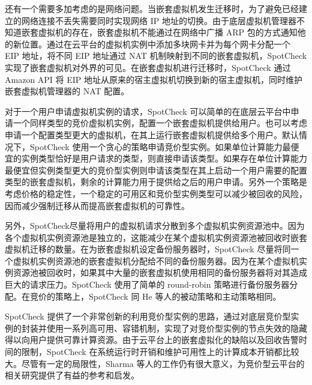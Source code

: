 还有一个需要多加考虑的是网络问题。当嵌套虚拟机发生迁移时，为了避免已经建立的网络连接不丢失需要同时实现网络 IP 地址的切换。由于底层虚拟机管理器不知道嵌套虚拟机的存在，嵌套虚拟机不能通过在网络中广播 ARP 包的方式通知他的新位置。通过在云平台的虚拟机实例中添加多块网卡并为每个网卡分配一个 EIP 地址，将不同 EIP 地址通过 NAT 机制映射到不同的嵌套虚拟机，SpotCheck 实现了嵌套虚拟机对外界的可见。在嵌套虚拟机进行迁移时，SpotCheck 通过 Amazon API 将 EIP 地址从原来的宿主虚拟机切换到新的宿主虚拟机，同时维护嵌套虚拟机管理器的 NAT 配置。

对于一个用户申请虚拟机实例的请求，SpotCheck 可以简单的在底层云平台中申请一个同样类型的竞价虚拟机实例，配置一个嵌套虚拟机提供给用户。也可以考虑申请一个配置类型更大的虚拟机，在其上运行嵌套虚拟机提供给多个用户。默认情况下，SpotCheck 使用一个贪心的策略申请竞价型实例。如果单位计算能力最便宜的实例类型恰好是用户请求的类型，则直接申请该类型。如果存在单位计算能力最便宜但实例类型更大的竞价型实例则申请该类型在其上启动一个用户需要的配置类型的嵌套虚拟机，剩余的计算能力用于提供给之后的用户申请。另外一个策略是考虑价格的稳定性，一个稳定的可用区和竞价型实例类型可以减少被回收的风险，因而减少强制迁移从而提高嵌套虚拟机的可靠性。

另外，SpotCheck尽量将用户的虚拟机请求分散到多个虚拟机实例资源池中。因为各个虚拟机实例资源池是独立的，这能减少在某个虚拟机实例资源池被回收时嵌套虚拟机迁移的数量。在为嵌套虚拟机设定备份服务器时，SpotCheck 尽量将同一个虚拟机实例资源池的嵌套虚拟机分配给不同的备份服务器。因为在某个虚拟机实例资源池被回收时，如果其中大量的嵌套虚拟机使用相同的备份服务器将对其造成巨大的请求压力。SpotCheck 使用了简单的 round-robin 策略进行备份服务器分配。在竞价的策略上，SpotCheck 同 He 等人的被动策略和主动策略相同。

SpotCheck 提供了一个非常创新的利用竞价型实例的思路，通过对底层竞价型实例的封装并使用一系列高可用、容错机制，实现了对竞价型实例的节点失效的隐藏得以向用户提供可靠计算资源。由于云平台上的嵌套虚拟化的缺陷以及回收告警时间的限制，SpotCheck 在系统运行时开销和维护可用性上的计算成本开销都比较大。尽管有一定的局限性，Sharma 等人的工作仍有很大意义，为竞价型云平台的相关研究提供了有益的参考和启发。

